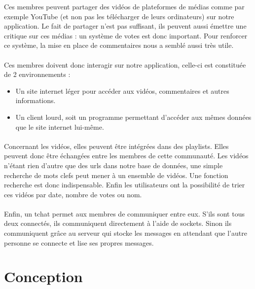 \documentclass{article}
\begin{document}
Ces membres peuvent partager des vidéos de plateformes de médias comme par exemple YouTube
(et non pas les télécharger de leurs ordinateurs) sur notre application.
Le fait de partager n'est pas suffisant, ils peuvent aussi émettre une critique sur ces médias : un système de votes est donc important. Pour renforcer ce système, la mise en place de commentaires nous a semblé aussi très utile. 

\paragraph{}
Ces membres doivent donc interagir sur notre application, celle-ci est constituée de 2 environnements :
\begin{itemize}
	\item Un site internet léger pour accéder aux vidéos, commentaires et autres informations.
	\item Un client lourd, soit un programme permettant d'accéder aux mêmes données que le site internet lui-même.
\end{itemize}

\paragraph{} 
Concernant les vidéos, elles peuvent être intégrées dans des playlists. Elles peuvent donc être 
échangées entre les membres de cette communauté. Les vidéos n'étant rien d'autre que des urls dans notre base de données, une simple recherche de mots clefs peut mener à un ensemble de vidéos.
Une fonction recherche est donc indispensable. 
Enfin les utilisateurs ont la possibilité de trier ces vidéos par date, nombre de votes ou nom.

\paragraph{}
Enfin, un tchat permet aux membres de communiquer entre eux. S'ils sont tous deux connectés, ils communiquent directement à l'aide de sockets. Sinon ils communiquent grâce au serveur qui stocke les messages en attendant que l'autre personne se connecte et lise ses propres messages.



\section{Conception}
\end{document}
